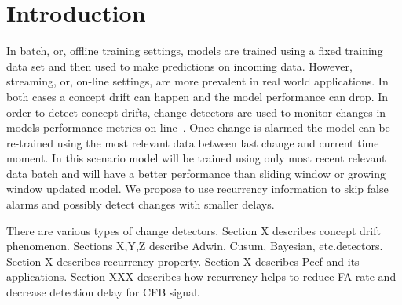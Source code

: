 \chapter{Introduction}

In batch, or, offline training settings, models are trained using a fixed training data set and then used to make predictions on incoming data. 
However, streaming, or, on-line settings, are more prevalent in real world applications. 
In both cases a concept drift can happen and the model performance can drop. 
In order to detect concept drifts, change detectors are used to monitor changes in models performance metrics on-line~\cite{gama2004learning}. 
Once change is alarmed the model can be re-trained using the most relevant data between last change and current time moment.
In this scenario model will be trained using only most recent relevant data batch and will have a better performance than sliding window or growing window updated model.
We propose to use recurrency information to skip false alarms and possibly detect changes with smaller delays.

There are various types of change detectors. 
Section X describes concept drift phenomenon.
Sections X,Y,Z describe Adwin, Cusum, Bayesian, etc.detectors.
Section X describes recurrency property.
Section X describes Pccf and its applications.
Section XXX describes how recurrency helps to reduce FA rate and decrease detection delay for CFB signal.

